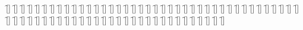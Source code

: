 \begin{questions}
\begin{multicols}{2}
        \question  \f[]
        \question  \f[]
        \question  \f[]
        \question  \f[]
        \question  \f[]
        \question  \f[]
        \question  \f[]
        \question  \f[]
        \question  \f[]
        \question  \f[]
        \question  \f[]
        \question  \f[]
        \question  \f[]
        \question  \f[]
        \question  \f[]
        \question  \f[]
        \question  \f[]
        \question  \f[]
        \question  \f[]
        \question  \f[]
        \question  \f[]
        \question  \f[]
        \question  \f[]
        \question  \f[]
        \question  \f[]
        \question  \f[]
        \question  \f[]
        \question  \f[]
        \question  \f[]
        \question  \f[]
        \question  \f[]
        \question  \f[]
        \question  \f[]
        \question  \f[]
        \question  \f[]
        \question  \f[]
        \question  \f[]
        \question  \f[]
        \question  \f[]
        \question  \f[]
        \question  \f[]
        \question  \f[]
        \question  \f[]
        \question  \f[]
        \question  \f[]
        \question  \f[]
        \question  \f[]
        \question  \f[]
        \question  \f[]
        \question  \f[]
        \question  \f[]
        \question  \f[]
        \question  \f[]
        \question  \f[]
        \question  \f[]
        \question  \f[]
        \question  \f[]
        \question  \f[]
        \question  \f[]
        \question  \f[]
        \question  \f[]
        \question  \f[]
        \question  \f[]
        \question  \f[]
        \question  \f[]
        \question  \f[]
        \question  \f[]
        \question  \f[]
        \question  \f[]
        \question  \f[]
    \end{multicols}
\end{questions}
